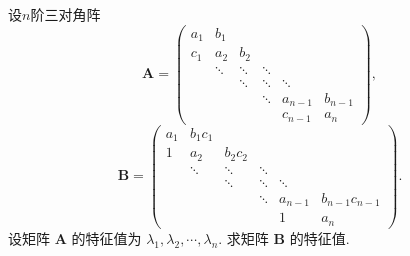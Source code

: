 \documentclass[../../main.tex]{subfiles}%
\begin{document}
\begin{example}
设$n$阶三对角阵
\[
\boldsymbol{A} = \begin{pmatrix} a_1 & b_1 \\ c_1 & a_2 & b_2 \\ & \ddots & \ddots & \ddots \\ & & \ddots & \ddots & \ddots \\ & & & \ddots & a_{n - 1} & b_{n - 1} \\ & & & & c_{n - 1} & a_n \end{pmatrix},
\]
\[
\boldsymbol{B} = \begin{pmatrix} a_1 & b_1c_1 \\ 1 & a_2 & b_2c_2 \\ & \ddots & \ddots & \ddots \\ & & \ddots & \ddots & \ddots \\ & & & \ddots & a_{n - 1} & b_{n - 1}c_{n - 1} \\ & & & & 1 & a_n \end{pmatrix}.
\]
设矩阵 \(\boldsymbol{A}\) 的特征值为 \(\lambda_1, \lambda_2, \cdots, \lambda_n\). 求矩阵 \(\boldsymbol{B}\) 的特征值.
\end{example}
\end{document}
